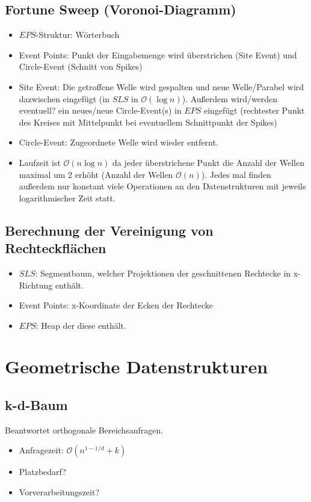 \documentclass[a4paper]{article}
\begin{document}
\subsection*{Fortune Sweep (Voronoi-Diagramm)}
\begin{itemize}
	\item $EPS$-Struktur: Wörterbuch
	\item Event Points: Punkt der Eingabemenge wird überstrichen (Site Event)  
	und Circle-Event (Schnitt von Spikes) 
	\item Site Event: Die getroffene Welle wird gespalten und neue Welle/Parabel wird 
	dazwischen eingefügt (in $SLS$ in $\mathcal{O}(\log n)$).
	Außerdem wird/werden eventuell? ein neues/neue Circle-Event(s) in $EPS$ eingefügt (rechtester Punkt des Kreises
	mit Mittelpunkt bei eventuellem Schnittpunkt der Spikes)
	\item Circle-Event: Zugeordnete Welle wird wieder entfernt.
	\item Laufzeit ist $\mathcal{O}(n \log n)$ da jeder überstrichene Punkt die Anzahl der Wellen
	maximal um 2 erhöht (Anzahl der Wellen $\mathcal{O}(n)$). Jedes mal finden außerdem nur konstant viele
	Operationen an den Datenstrukturen mit jeweils logarithmischer Zeit statt.
\end{itemize}

\subsection*{Berechnung der Vereinigung von Rechteckflächen}
\begin{itemize}
	\item $SLS$: Segmentbaum, welcher Projektionen der geschnittenen Rechtecke in x-Richtung enthält.
	\item Event Points: x-Koordinate der Ecken der Rechtecke
	\item $EPS$: Heap der diese enthält.
\end{itemize}
\section*{Geometrische Datenstrukturen}
\subsection*{k-d-Baum}
Beantwortet orthogonale Bereichsanfragen.
\begin{itemize}
	\item Anfragezeit: $\mathcal{O}(n^{1-1/d} + k)$
	\item Platzbedarf?
	\item Vorverarbeitungszeit?
\end{itemize}
\end{document}
